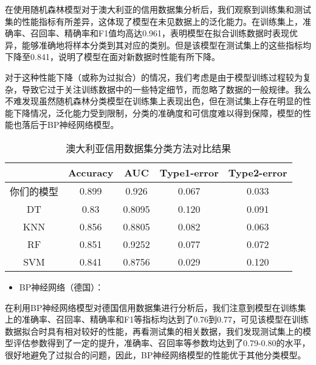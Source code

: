 \documentclass[12pt,a4paper]{nmmcm}
\begin{document}
在使用随机森林模型对于澳大利亚的信用数据集分析后，我们观察到训练集和测试集的性能指标有所差异，这体现了模型在未见数据上的泛化能力。在训练集上，准确率、召回率、精确率和F1值均高达0.961，表明模型在拟合训练数据时表现优异，能够准确地将样本分类到其对应的类别。但是该模型在测试集上的这些指标均下降至0.841，说明了模型在面对新数据时性能有所下降。

对于这种性能下降（或称为过拟合）的情况，我们考虑是由于模型训练过程较为复杂，导致它过于关注训练数据中的一些特定细节，而忽略了数据的一般规律。我么不难发现虽然随机森林分类模型在训练集上表现出色，但在测试集上存在明显的性能下降情况，泛化能力受到限制，分类的准确度和可信度难以得到保障，模型的性能也落后于BP神经网络模型。
\\

\begin{table}[H]
\centering
 \caption{澳大利亚信用数据集分类方法对比结果}
\begin{tabular}{ccccc}

\hline
      & Accuracy & AUC & Type1-error & Type2-error \\
      \hline
你们的模型 &0.899&        0.926&     0.067&  0.033             \\
DT    &0.83&    0.8095   &    0.120 &   0.091                 \\
KNN   &0.856&          0.8805& 0.082    & 0.063            \\
RF    &0.851&          0.9252& 0.077 &  0.072                 \\
SVM   &0.841&          0.8756&    0.029 & 0.120                       \\
\hline
\end{tabular}
    \label{fig:enter-label}
\end{table}	




\begin{itemize}
   \item
   BP神经网络（德国）：
   \end{itemize}
   
在利用BP神经网络模型对德国信用数据集进行分析后，我们注意到模型在训练集上的准确率、召回率、精确率和F1等指标均达到了0.76到0.77，可见该模型在训练数据拟合时具有相对较好的性能，再看测试集的相关数据，我们发现测试集上的模型评估参数得到了一定的提升，准确率、召回率等参数均达到了0.79-0.80的水平，很好地避免了过拟合的问题，因此，BP神经网络模型的性能优于其他分类模型。
\end{document}
